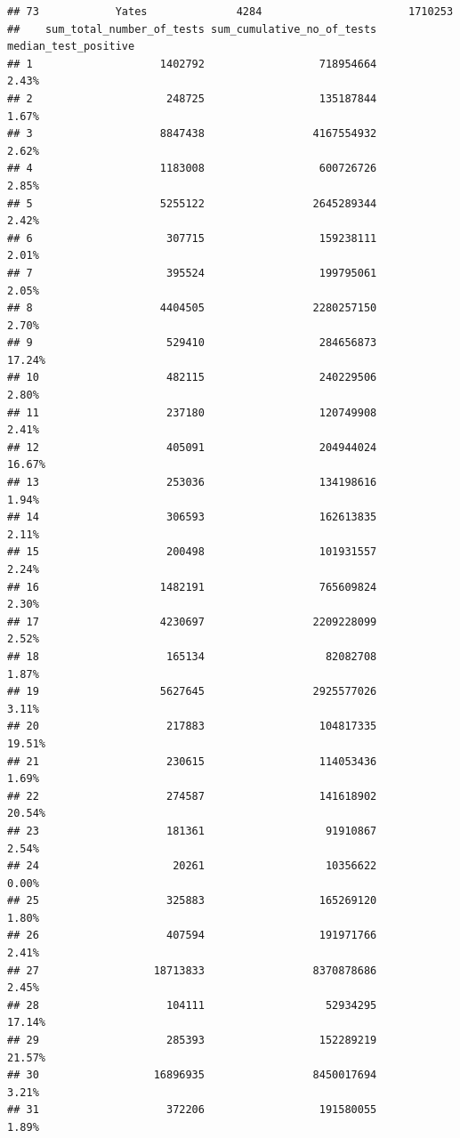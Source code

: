\documentclass[
  12pt,
]{article}
\begin{document}
\begin{verbatim}
## 73            Yates              4284                       1710253
##    sum_total_number_of_tests sum_cumulative_no_of_tests median_test_positive
## 1                    1402792                  718954664                2.43%
## 2                     248725                  135187844                1.67%
## 3                    8847438                 4167554932                2.62%
## 4                    1183008                  600726726                2.85%
## 5                    5255122                 2645289344                2.42%
## 6                     307715                  159238111                2.01%
## 7                     395524                  199795061                2.05%
## 8                    4404505                 2280257150                2.70%
## 9                     529410                  284656873               17.24%
## 10                    482115                  240229506                2.80%
## 11                    237180                  120749908                2.41%
## 12                    405091                  204944024               16.67%
## 13                    253036                  134198616                1.94%
## 14                    306593                  162613835                2.11%
## 15                    200498                  101931557                2.24%
## 16                   1482191                  765609824                2.30%
## 17                   4230697                 2209228099                2.52%
## 18                    165134                   82082708                1.87%
## 19                   5627645                 2925577026                3.11%
## 20                    217883                  104817335               19.51%
## 21                    230615                  114053436                1.69%
## 22                    274587                  141618902               20.54%
## 23                    181361                   91910867                2.54%
## 24                     20261                   10356622                0.00%
## 25                    325883                  165269120                1.80%
## 26                    407594                  191971766                2.41%
## 27                  18713833                 8370878686                2.45%
## 28                    104111                   52934295               17.14%
## 29                    285393                  152289219               21.57%
## 30                  16896935                 8450017694                3.21%
## 31                    372206                  191580055                1.89%

\end{verbatim}
\end{document}
